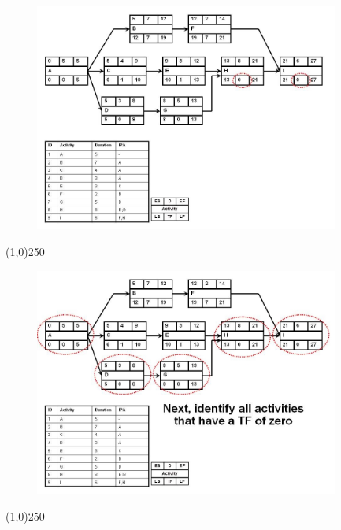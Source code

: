 \begin{frame}
\begin{figure}
	\centering
		\includegraphics[width = 10.0cm]{oldnotes/Slide166.jpg}
\end{figure}
\end{frame}
\begin{center}\line(1,0){250}\end{center}




\begin{frame}
\begin{figure}
	\centering
		\includegraphics[width = 10.0cm]{oldnotes/Slide167.jpg}
\end{figure}
\end{frame}
\begin{center}\line(1,0){250}\end{center}




